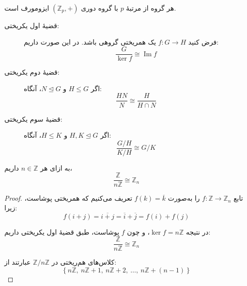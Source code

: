 \begin{example}
    هر گروه از مرتبهٔ
    $p$
    با گروه دوری $(\mathbb{Z}_p,+)$ ایزومورف است.
\end{example}




\begin{theorem}
    \begin{description}
        \item[قضیهٔ اول یکریختی:]
              فرض کنید $f \colon G \to H$ یک همریختی گروهی باشد. در این صورت داریم:
              \[
                  \frac{G}{\ker f} \cong \operatorname{Im} f
              \]

        \item[قضیهٔ دوم یکریختی:]
              اگر $H \leq G$ و $N \trianglelefteq G$، آنگاه:
              \[
                  \frac{HN}{N} \cong \frac{H}{H \cap N}
              \]

        \item[قضیهٔ سوم یکریختی:]
              اگر
              $H, K \trianglelefteq G$
              و
              $H \leq K $، آنگاه:
              \[
                  \frac{G/H}{K/H} \cong G/K
              \]
    \end{description}
\end{theorem}


\begin{example}
    به ازای هر
    \(n \in \mathbb{Z}\)
    داریم،
    \[
        \frac{\mathbb{Z}}{n\mathbb{Z}} \cong \mathbb{Z}_n
    \]


\end{example}


\begin{proof}
    تابع $f \colon \mathbb{Z} \to \mathbb{Z}_n$ را به‌صورت $f(k) = \overline{k}$ تعریف می‌کنیم که همریختی پوشاست، زیرا:
    \[
        f(i + j) = \overline{i + j} = \overline{i} + \overline{j} = f(i) + f(j)
    \]

    در نتیجه $\ker f = n\mathbb{Z}$، و چون $f$ پوشاست، طبق قضیهٔ اول یکریختی داریم:
    \[
        \frac{\mathbb{Z}}{n\mathbb{Z}} \cong \mathbb{Z}_n
    \]

    کلاس‌های هم‌ریختی در $\mathbb{Z}/n\mathbb{Z}$ عبارتند از:
    \[
        \left\{ n\mathbb{Z},\ n\mathbb{Z}+1,\ n\mathbb{Z}+2,\ \ldots,\ n\mathbb{Z}+(n-1) \right\}
    \]
\end{proof}


